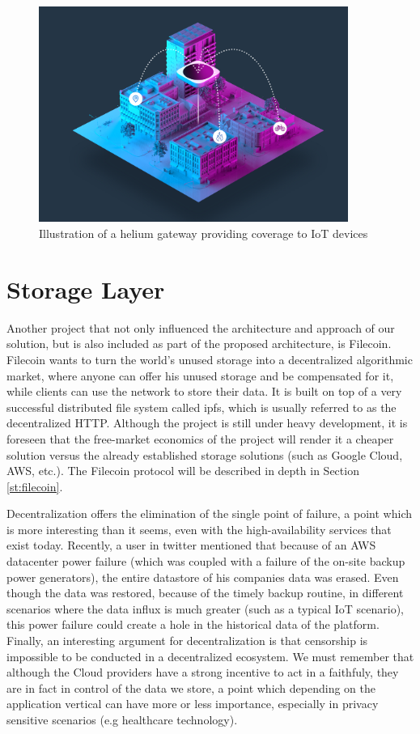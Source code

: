 \begin{figure}[h]
    \centering
    \includegraphics[width=0.9\textwidth]{images/helium.png}
    \caption{Illustration of a helium gateway providing coverage to IoT devices\cite{helium}}
    \label{fig:helium}
\end{figure}

\section{Storage Layer}

Another project that not only influenced the architecture and approach of our solution, but is also included as part of the proposed architecture, is Filecoin. Filecoin wants to turn the world’s unused storage into a decentralized algorithmic market, where anyone can offer his unused storage and be compensated for it, while clients can use the network to store their data. It is built on top of a very successful distributed file system called \acrfull{ipfs}, which is usually referred to as the decentralized HTTP. Although the project is still under heavy development, it is foreseen that the free-market economics of the project will render it a cheaper solution versus the already established storage solutions (such as Google Cloud, AWS, etc.). The Filecoin protocol will be described in depth in Section \ref{st:filecoin}. 


Decentralization offers the elimination of the single point of failure,  a point which is more interesting than it seems, even with the high-availability services that exist today. Recently, a user in twitter \cite{gigazine} mentioned that because of an AWS datacenter power failure (which was coupled with a failure of the on-site backup power generators), the entire datastore of his companies data was erased. Even though the data was restored, because of the timely backup routine, in different scenarios where the data influx is much greater (such as a typical IoT scenario), this power failure could create a hole in the historical data of the platform. Finally, an interesting argument for decentralization is that censorship is impossible to be conducted in a decentralized ecosystem. We must remember that although the Cloud providers have a strong incentive to act in a faithfuly, they are in fact in control of the data we store, a point which depending on the application vertical can have more or less importance, especially in privacy sensitive scenarios (e.g healthcare technology).


